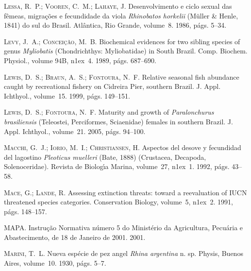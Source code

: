 \documentclass[a4paper,11pt,twoside,showtrims,onecolumn,openright,final]{memoir}
\begin{document}
\begin{thebibliography}{194}
\textsc{Lessa, R.~P.; Vooren, C.~M.; Lahaye, J.}
\newblock Desenvolvimento e ciclo sexual das f\^emeas, migra\c{c}\~oes e
  fecundidade da viola \emph{{R}hinobatos horkelii} ({M}\"uller \& {H}enle, 1841) do
  sul do {B}rasil.
\newblock Atl\^antica, Rio Grande, volume~8. 1986, p\'ags. 5--34.

\textsc{Levy, J.~A.; Concei\c{c}\~ao, M.~B.}
\newblock Biochemical evidences for two sibling species of genus \emph{{M}yliobatis}
  ({C}hondrichthys: {M}yliobatidae) in {S}outh {B}razil.
\newblock Comp. Biochem. Physiol., volume 94B,
  n\raise1ex\hbox{}~4. 1989, p\'ags. 687--690.

\textsc{Lewis, D.~S.; Braun, A.~S.; Fontoura, N.~F.}
\newblock Relative seasonal fish abundance caught by recreational fishery on
  {C}idreira {P}ier, southern {B}razil.
\newblock J. Appl. Ichthyol., volume~15. 1999, p\'ags. 149--151.

\textsc{Lewis, D.~S.; Fontoura, N.~F.}
\newblock Maturity and growth of \emph{{P}aralonchurus brasiliensis} ({T}eleostei,
  {P}erciformes, {S}ciaenidae) females in southern {B}razil.
\newblock J. Appl. Ichthyol., volume~21. 2005, p\'ags. 94--100.

\textsc{Macchi, G.~J.; Iorio, M.~I.; Christiansen, H.}
\newblock Aspectos del desove y fecundidad del lagostino \emph{{P}leoticus muelleri}
  ({B}ate, 1888) ({C}rustacea, {D}ecapoda, {S}olenoceridae).
\newblock Revista de Biolog\'{\i}a Marina, volume~27,
  n\raise1ex\hbox{}~1. 1992, p\'ags. 43--58.

\textsc{Mace, G.; Lande, R.}
\newblock Assessing extinction threats: toward a reevaluation of {IUCN}
  threatened species categories.
\newblock Conservation Biology, volume~5, n\raise1ex\hbox{}~2. 1991, p\'ags. 148--157.

\textsc{MAPA}.
\newblock Instru\c{c}\~ao {N}ormativa n\'umero 5 do {M}inist\'erio da
  {A}gricultura, {P}ecu\'aria e {A}bastecimento, de 18 de {J}aneiro de 2001.
  2001.

\textsc{Marini, T.~L.}
\newblock Nueva esp\'ecie de pez angel \emph{{R}hina argentina} n. sp.
\newblock Physis, Buenos Aires, volume~10. 1930, p\'ags. 5--7.


\end{thebibliography}
\end{document}
